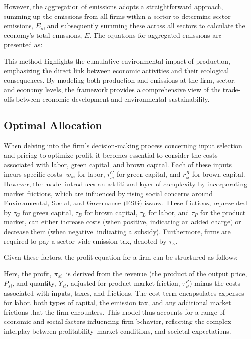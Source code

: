 However, the aggregation of emissions adopts a straightforward approach, summing up the emissions from all firms within a sector to determine sector emissions, $E_s$, and subsequently summing these across all sectors to calculate the economy's total emissions, $E$. The equations for aggregated emissions are presented as:


This method highlights the cumulative environmental impact of production, emphasizing the direct link between economic activities and their ecological consequences. By modeling both production and emissions at the firm, sector, and economy levels, the framework provides a comprehensive view of the trade-offs between economic development and environmental sustainability.



\subsection{Optimal Allocation} \label{sec:optimal_allocation}

When delving into the firm's decision-making process concerning input selection and pricing to optimize profit, it becomes essential to consider the costs associated with labor, green capital, and brown capital. Each of these inputs incurs specific costs: $w_{si}$ for labor, $r_{si}^G$ for green capital, and $r_{si}^B$ for brown capital. However, the model introduces an additional layer of complexity by incorporating market frictions, which are influenced by rising social concerns around Environmental, Social, and Governance (ESG) issues. These frictions, represented by $\tau_{G}$ for green capital, $\tau_{B}$ for brown capital, $\tau_{L}$ for labor, and $\tau_{P}$ for the product market, can either increase costs (when positive, indicating an added charge) or decrease them (when negative, indicating a subsidy). Furthermore, firms are required to pay a sector-wide emission tax, denoted by $\tau_{E}$.

Given these factors, the profit equation for a firm can be structured as follows:


Here, the profit, $\pi_{si}$, is derived from the revenue (the product of the output price, $P_{si}$, and quantity, $Y_{si}$, adjusted for product market friction, $\tau_{si}^P$) minus the costs associated with inputs, taxes, and frictions. The cost term encapsulates expenses for labor, both types of capital, the emission tax, and any additional market frictions that the firm encounters. This model thus accounts for a range of economic and social factors influencing firm behavior, reflecting the complex interplay between profitability, market conditions, and societal expectations.

